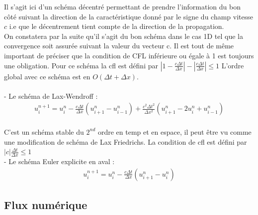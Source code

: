 \documentclass[12pt]{article}
\begin{document}
\noindent Il s'agit ici d'un schéma décentré permettant de prendre l'information du bon côté suivant la direction de la caractéristique donné par le signe du champ vitesse $c$ i.e que le décentrement tient compte de la direction de la propagation.
\\On constatera par la suite qu'il s'agit du bon schéma dans le cas 1D tel que la convergence soit assurée suivant la valeur du vecteur c. Il est tout de même important de préciser que la condition de CFL inférieure ou égale à 1 est toujours une obligation. Pour ce schéma la cfl est défini par  $|1-\frac{c\Delta t}{\Delta x}|-|\frac{c\Delta t}{\Delta x}|\leq 1$
L'ordre global avec ce schéma est en $O(\Delta t + \Delta x)$.
\\
\\- Le schéma de Lax-Wendroff :
\\
\begin{eqnarray*}
        u^{n+1}_i=u_i^n-\frac{c\Delta t}{\Delta x}({u_{i+1}^n-u_{i-1}^n}) +\frac{c^2\Delta t^2}{\Delta x^2}(u_{i+1}^n-2u_{i}^n+u^{n}_{i-1})
\end{eqnarray*}
\\C'est un schéma stable du $2^{nd}$ ordre en temp et en espace, il peut être vu comme une modification de schéma de Lax Friedrichs.
La condition de cfl est défini par $|c|\frac{\Delta t}{\Delta x}\leq 1$
\\- Le schéma Euler explicite en aval :
\\
\begin{eqnarray*}
        u^{n+1}_i=u_i^n-\frac{c\Delta t}{\Delta x}({u_{i+1}^n-u_{i}^n})
\end{eqnarray*}

\newpage
\subsection{Flux numérique}
\end{document}
